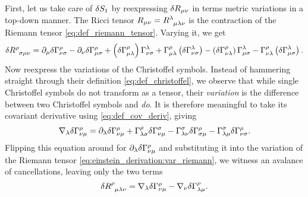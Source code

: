 
First, let us take care of $\delta S_1$ by reexpressing $\delta R_{\mu \nu}$ in terms metric variations in a top-down manner.
The Ricci tensor $R_{\mu \nu} = R\indices{^\lambda_\mu_\lambda_\nu}$ is the contraction of the Riemann tensor \eqref{eq:def_riemann_tensor}.
Varying it, we get
\begin{equation}
	\variation{R\indices{^\rho_\sigma_\mu_\nu}} = \partial_\mu \variation{\Gamma^\rho_{\nu \sigma}}
	                                            - \partial_\nu \variation{\Gamma^\rho_{\mu \sigma}}
												+ \left(\variation{\Gamma^\rho_{\mu \lambda}}\right) \Gamma^\lambda_{\nu \sigma}
												+ \Gamma^\rho_{\mu \lambda} \left(\variation{\Gamma^\lambda_{\nu \sigma}\right)}
												- \left(\variation{\Gamma^\rho_{\nu \lambda}}\right) \Gamma^\lambda_{\mu \sigma}
												- \Gamma^\rho_{\nu \lambda} \left(\variation{\Gamma^\lambda_{\mu \sigma}\right)} .
	\label{eq:einstein_derivation:var_riemann}
\end{equation}
Now reexpress the variations of the Christoffel symbols.
Instead of hammering straight through their definition \eqref{eq:def_christoffel}, we observe that while single Christoffel symbols do not transform as a tensor, their \emph{variation} is the difference between two Christoffel symbols and \emph{do}. \cite[page 96,98]{ref:carroll}
It is therefore meaningful to take its covariant derivative using \cref{eq:def_cov_deriv}, giving
\begin{equation}
	\nabla_\lambda \delta \Gamma^\rho_{\nu \mu} = \partial_\lambda \delta \Gamma^\rho_{\nu \mu} 
	                                                 + \Gamma^\rho_{\lambda \sigma} \delta \Gamma{^\sigma_{\nu \mu}} 
	                                                 - \Gamma^\sigma_{\lambda \nu} \delta \Gamma{^\rho_{\sigma \mu}} 
	                                                 - \Gamma^\sigma_{\lambda \mu} \delta \Gamma{^\rho_{\nu \sigma}} .
	\label{eq:einstein_derivation:christoffel_cov_deriv}
\end{equation}
Flipping this equation around for $\partial_\lambda \delta \Gamma^\rho_{\nu \mu}$ and substituting it into the variation of the Riemann tensor \eqref{eq:einstein_derivation:var_riemann}, we witness an avalance of cancellations, leaving only the two terms
\begin{equation}
	\variation{R\indices{^\rho_\mu_\lambda_\nu}} = \nabla_\lambda \variation{\Gamma^\rho_{\nu \mu}}
	                                             - \nabla_\nu \variation{\Gamma^\rho_{\lambda \mu}} .
\end{equation}

